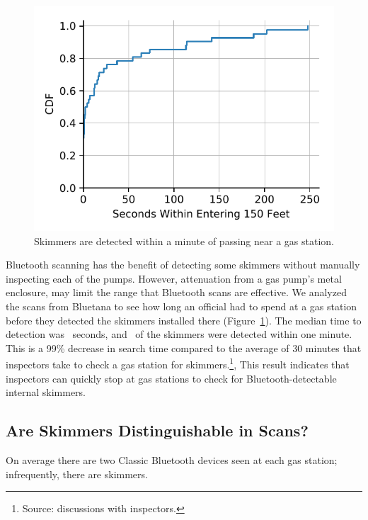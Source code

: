 \begin{figure}
\centering
\captionsetup{justification=centering}
\includegraphics[width=0.6\linewidth]{skimmer/plots/cdf_skim_discover_time.pdf}
\caption{
\label{fig:skim_discover_time}
 Skimmers are detected within a minute of passing near a gas station.
}
\end{figure}

Bluetooth scanning has the benefit of detecting some skimmers without manually inspecting each of the pumps.
%
However, attenuation from a gas pump's metal enclosure, may limit the range that Bluetooth scans are effective.
%
We analyzed the scans from Bluetana to see how long an official had to spend at a gas station before they detected the skimmers installed there (Figure~\ref{fig:skim_discover_time}).
%
%
The median time to detection was \skimmerdetectiontimemedian~seconds, and \skimmeroneminutepercent~of the skimmers were detected within one minute.
%
This is a 99\% decrease in search time compared to the average of 30 minutes
that inspectors take to check a gas station for skimmers.\footnote{Source:
discussions with inspectors.},
%
This result indicates that inspectors can quickly stop at gas stations to check for Bluetooth-detectable internal skimmers.

%
%



\subsection{Are Skimmers Distinguishable in Scans?} %
\label{sec:bluetooth:scans}

\begin{table}
    \centering
    \captionsetup{justification=centering}
    \caption{On average there are two Classic Bluetooth devices seen at each gas
    station; infrequently, there are skimmers.
    }
    

    \label{tab:data-overview}
\end{table}





